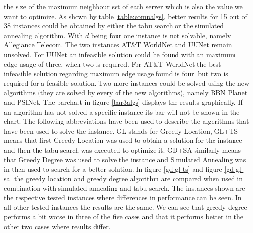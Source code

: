 \documentclass [12pt]{article}
\begin{document}
  the size of the maximum neighbour set of each server which is also the value we want to optimize. As shown by table \ref{table:compalgs}, better results for 15 out of 38 instances could be obtained 
  by either the tabu search or the simulated annealing algorithm. With $d$ being four one instance is not solvable, namely Allegiance Telecom. 
  The two instances AT\&T WorldNet and UUNet remain unsolved. For UUNet an infeasible solution could be found with an maximum edge usage of three, when two is required. 
  For AT\&T WorldNet the best infeasible solution regarding maximum edge usage found is four, but two is required for a feasible solution. 
  Two more instances could be solved using the new algorithms (they are solved by every of the new algorithms), namely BBN Planet and PSINet.
  The barchart in figure \ref{bar3algs} displays the results graphically. If an algorithm has not solved a specific instance its bar will not be shown in the chart.
  The following abbreviations have been used to describe the algorithms that have been used to solve the instance. GL stands for Greedy Location, GL+TS means that first Greedy Location was used 
  to obtain a solution for the instance and then the tabu search was executed to optimize it. GD+SA similarly means that Greedy Degree was used to solve the instance and Simulated Annealing was in then used
  to search for a better solution. In figure \ref{gd-gl-ts} and figure \ref{gd-gl-sa} the greedy location and greedy degree algorithm are compared when used in combination with simulated
  annealing and tabu search. The instances shown are the respective tested instances where differences in performance can be seen. In all other tested instances the results are the same. 
  We can see that greedy degree performs a bit worse in three of the five cases and that it performs better in the other two cases where results differ.
\end{document}
